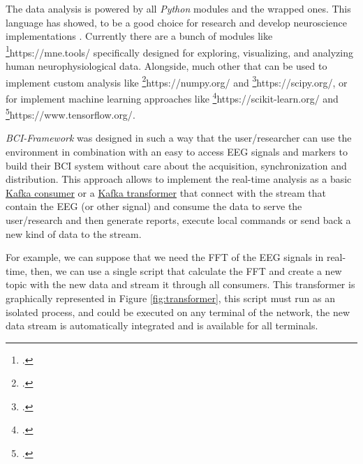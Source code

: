 The data analysis is powered by all \textit{Python} modules and the wrapped ones. This language has showed, to be a good choice for research and develop neuroscience implementations \cite{muller2015python}. Currently there are a bunch of modules like \footcite{MNE}{https://mne.tools/} specifically designed for exploring, visualizing, and analyzing human neurophysiological data. Alongside, much other that can be used to implement custom analysis like \footcite{Numpy}{https://numpy.org/} and \footcite{Scipy}{https://scipy.org/}, or for implement machine learning approaches like \footcite{Scikit-learn}{https://scikit-learn.org/} and \footcite{TensorFlow}{https://www.tensorflow.org/}.


\textit{BCI-Framework} was designed in such a way that the user/researcher can use the environment in combination with an easy to access \gls*{EEG} signals and markers to build their BCI system without care about the acquisition, synchronization and distribution. This approach allows to implement the real-time analysis as a basic \hyperref[]{Kafka consumer} or a \hyperref[]{Kafka transformer} that connect with the stream that contain the \gls*{EEG} (or other signal) and consume the data to serve the user/research and then generate reports, execute local commands or send back a new kind of data to the stream.



For example, we can suppose that we need the \gls*{FFT} of the \gls*{EEG} signals in real-time, then, we can use a single script that calculate the \gls*{FFT} and create a new topic with the new data and stream it through all consumers. This transformer is graphically represented in Figure \ref{fig:transformer}, this script must run as an isolated process, and could be executed on any terminal of the network, the new data stream is automatically integrated and is available for all terminals.


